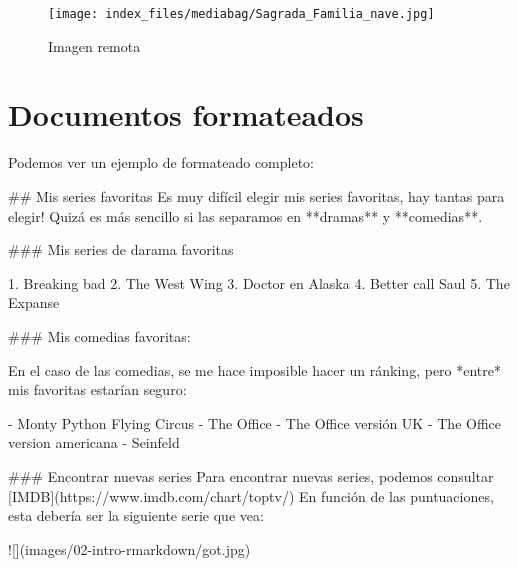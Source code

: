 \documentclass[
  letterpaper,
  DIV=11,
  numbers=noendperiod]{scrreprt}
\newenvironment{Shaded}{\begin{snugshade}}{\end{snugshade}}
\newcommand{\AlertTok}[1]{\textcolor[rgb]{0.68,0.00,0.00}{#1}}
\newcommand{\CommentTok}[1]{\textcolor[rgb]{0.37,0.37,0.37}{#1}}
\newcommand{\FunctionTok}[1]{\textcolor[rgb]{0.28,0.35,0.67}{#1}}
\newcommand{\NormalTok}[1]{\textcolor[rgb]{0.00,0.23,0.31}{#1}}
\newcommand{\OtherTok}[1]{\textcolor[rgb]{0.00,0.23,0.31}{#1}}
\newcommand{\SpecialStringTok}[1]{\textcolor[rgb]{0.13,0.47,0.30}{#1}}
\begin{document}
\begin{figure}

{\centering \texttt{[image: index\_files/mediabag/Sagrada\_Familia\_nave.jpg]}

}

\caption{Imagen remota}

\end{figure}

\hypertarget{documentos-formateados}{%
\section{Documentos formateados}\label{documentos-formateados}}

Podemos ver un ejemplo de formateado completo:

\begin{Shaded}
\begin{Highlighting}[]

\FunctionTok{\#\# Mis series favoritas}
\NormalTok{Es muy difícil elegir mis series favoritas, hay tantas para elegir!}
\NormalTok{Quizá es más sencillo si las separamos en **dramas** y **comedias**.}

\FunctionTok{\#\#\# Mis series de darama favoritas}

\SpecialStringTok{1. }\NormalTok{Breaking bad}
\SpecialStringTok{2. }\NormalTok{The West Wing}
\SpecialStringTok{3. }\NormalTok{Doctor en Alaska}
\SpecialStringTok{4. }\NormalTok{Better call Saul}
\SpecialStringTok{5. }\NormalTok{The Expanse}

\FunctionTok{\#\#\# Mis comedias favoritas:}

\NormalTok{En el caso de las comedias, se me hace imposible hacer un ránking, pero *entre* mis favoritas estarían seguro:}

\SpecialStringTok{{-} }\NormalTok{Monty Python Flying Circus}
\SpecialStringTok{{-} }\NormalTok{The Office}
\SpecialStringTok{    {-} }\NormalTok{The Office versión UK}
\SpecialStringTok{    {-} }\NormalTok{The Office version americana}
\SpecialStringTok{{-} }\NormalTok{Seinfeld}

\FunctionTok{\#\#\# Encontrar nuevas series}
\NormalTok{Para encontrar nuevas series, podemos consultar }\CommentTok{[}\OtherTok{IMDB}\CommentTok{](https://www.imdb.com/chart/toptv/)}
\NormalTok{En función de las puntuaciones, esta debería ser la siguiente serie que vea:}
    
\AlertTok{![](images/02{-}intro{-}rmarkdown/got.jpg)}
\end{Highlighting}
\end{Shaded}
\end{document}
